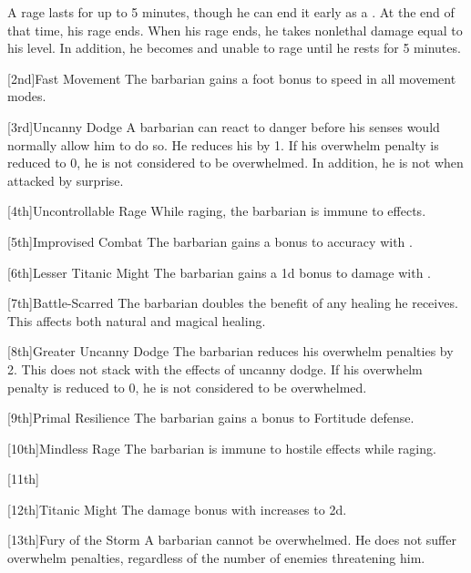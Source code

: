         A rage lasts for up to 5 minutes, though he can end it early as a .
        At the end of that time, his rage ends.
        When his rage ends, he takes nonlethal damage equal to his level.
        In addition, he becomes \fatigued and unable to rage until he rests for 5 minutes.

        [2nd]{Fast Movement}
        The barbarian gains a  foot bonus to speed in all movement modes.

        [3rd]{Uncanny Dodge}
        A barbarian can react to danger before his senses would normally allow him to do so.
        He reduces his  by 1.
        If his overwhelm penalty is reduced to 0, he is not considered to be overwhelmed.
        In addition, he is not \unaware when attacked by surprise.

        [4th]{Uncontrollable Rage}
        While raging, the barbarian is immune to  effects.

        [5th]{Improvised Combat}
        The barbarian gains a  bonus to accuracy with .

        [6th]{Lesser Titanic Might}
        The barbarian gains a \plus1d bonus to damage with .

        [7th]{Battle-Scarred}
        The barbarian doubles the benefit of any healing he receives.
        This affects both natural and magical healing.

        [8th]{Greater Uncanny Dodge}
        The barbarian reduces his overwhelm penalties by 2.
        This does not stack with the effects of uncanny dodge.
        If his overwhelm penalty is reduced to 0, he is not considered to be overwhelmed.

        [9th]{Primal Resilience}
        The barbarian gains a  bonus to Fortitude defense.

        [10th]{Mindless Rage}
        The barbarian is immune to hostile  effects while raging.

        [11th]{}

        [12th]{Titanic Might}
        The damage bonus with  increases to \plus2d.

        [13th]{Fury of the Storm}
        A barbarian cannot be overwhelmed.
        He does not suffer overwhelm penalties, regardless of the number of enemies threatening him.


